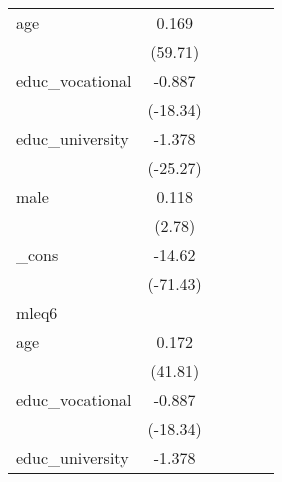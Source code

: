 {\begin{tabular}{l*{5}{c}}
age         &       0.169\sym{***}&                     &                     &                     &                     \\
            &     (59.71)         &                     &                     &                     &                     \\
[1em]
educ\_vocational&      -0.887\sym{***}&                     &                     &                     &                     \\
            &    (-18.34)         &                     &                     &                     &                     \\
[1em]
educ\_university&      -1.378\sym{***}&                     &                     &                     &                     \\
            &    (-25.27)         &                     &                     &                     &                     \\
[1em]
male        &       0.118\sym{**} &                     &                     &                     &                     \\
            &      (2.78)         &                     &                     &                     &                     \\
[1em]
\_cons      &      -14.62\sym{***}&                     &                     &                     &                     \\
            &    (-71.43)         &                     &                     &                     &                     \\
\hline
mleq6       &                     &                     &                     &                     &                     \\
age         &       0.172\sym{***}&                     &                     &                     &                     \\
            &     (41.81)         &                     &                     &                     &                     \\
[1em]
educ\_vocational&      -0.887\sym{***}&                     &                     &                     &                     \\
            &    (-18.34)         &                     &                     &                     &                     \\
[1em]
educ\_university&      -1.378\sym{***}&                     &                     &                     &                     \\

\end{tabular}}
